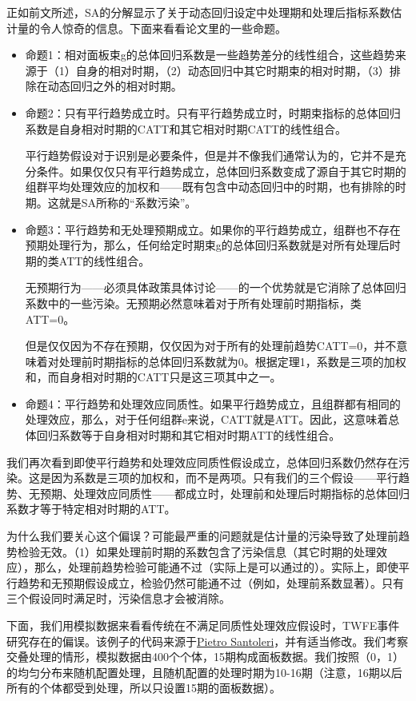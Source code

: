 \documentclass[cn,12pt,math=newtx,citestyle=gb7714-2015,bibstyle=gb7714-2015]{elegantbook}
\begin{document}
	正如前文所述，SA的分解显示了关于动态回归设定中处理期和处理后指标系数估计量的令人惊奇的信息。下面来看看论文里的一些命题。
	
	\begin{itemize}
		\item 命题1：相对面板束g的总体回归系数是一些趋势差分的线性组合，这些趋势来源于（1）自身的相对时期，（2）动态回归中其它时期束的相对时期，（3）排除在动态回归之外的相对时期。
		\item 命题2：只有平行趋势成立时。只有平行趋势成立时，时期束指标的总体回归系数是自身相对时期的CATT和其它相对时期CATT的线性组合。
		
		平行趋势假设对于识别是必要条件，但是并不像我们通常认为的，它并不是充分条件。如果仅仅只有平行趋势成立，总体回归系数变成了源自于其它时期的组群平均处理效应的加权和——既有包含中动态回归中的时期，也有排除的时期。这就是SA所称的“系数污染”。
		
		\item 命题3：平行趋势和无处理预期成立。如果你的平行趋势成立，组群也不存在预期处理行为，那么，任何给定时期束g的总体回归系数就是对所有处理后时期的类ATT的线性组合。
		
		无预期行为——必须具体政策具体讨论——的一个优势就是它消除了总体回归系数中的一些污染。无预期必然意味着对于所有处理前时期指标，类ATT=0。
		
		但是仅仅因为不存在预期，仅仅因为对于所有的处理前趋势CATT=0，并不意味着对处理前时期指标的总体回归系数就为0。根据定理1，系数是三项的加权和，而自身相对时期的CATT只是这三项其中之一。
		
		\item 命题4：平行趋势和处理效应同质性。如果平行趋势成立，且组群都有相同的处理效应，那么，对于任何组群e来说，CATT就是ATT。因此，这意味着总体回归系数等于自身相对时期和其它相对时期ATT的线性组合。
	\end{itemize}
	
	
	我们再次看到即使平行趋势和处理效应同质性假设成立，总体回归系数仍然存在污染。这是因为系数是三项的加权和，而不是两项。只有我们的三个假设——平行趋势、无预期、处理效应同质性——都成立时，处理前和处理后时期指标的总体回归系数才等于特定相对时期的ATT。
	
	为什么我们要关心这个偏误？可能最严重的问题就是估计量的污染导致了处理前趋势检验无效。（1）如果处理前时期的系数包含了污染信息（其它时期的处理效应），那么，处理前趋势检验可能通不过（实际上是可以通过的）。实际上，即使平行趋势和无预期假设成立，检验仍然可能通不过（例如，处理前系数显著）。只有三个假设同时满足时，污染信息才会被消除。
	
	下面，我们用模拟数据来看看传统在不满足同质性处理效应假设时，TWFE事件研究存在的偏误。该例子的代码来源于\href{https://github.com/pietrosantoleri/staggered_did}{Pietro Santoleri}，并有适当修改。我们考察交叠处理的情形，模拟数据由400个个体，15期构成面板数据。我们按照（0，1）的均匀分布来随机配置处理，且随机配置的处理时期为10-16期（注意，16期以后所有的个体都受到处理，所以只设置15期的面板数据）。
	
\end{document}
